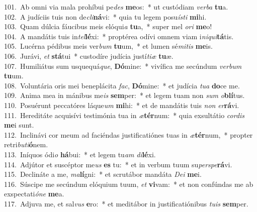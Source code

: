 {101.~}Ab omni via mala prohíbui pe\textit{des} \textbf{me}os:~* ut custódiam \textit{ver}\textit{ba} \textbf{tu}a.\\
{102.~}A judíciis tuis non de\textit{cli}\textbf{ná}vi:~* quia tu legem posu\textit{í}\textit{sti} \textbf{mi}hi.\\
{103.~}Quam dúlcia fáucibus meis elóqui\textit{a} \textbf{tu}a,~* super mel \textit{o}\textit{ri} \textbf{me}o!\\
{104.~}A mandátis tuis in\textit{tel}\textbf{lé}xi:~* proptérea odívi omnem viam i\textit{ni}\textit{qui}\textbf{tá}tis.\\
{105.~}Lucérna pédibus meis ver\textit{bum} \textbf{tu}um,~* et lumen sé\textit{mi}\textit{tis} \textbf{me}is.\\
{106.~}Jurávi, \textit{et} \textbf{stá}tui~* custodíre judícia justí\textit{ti}\textit{æ} \textbf{tu}æ.\\
{107.~}Humiliátus sum usquequá\textit{que}, \textbf{Dó}mine:~* vivífica me secúndum \textit{ver}\textit{bum} \textbf{tu}um.\\
{108.~}Voluntária oris mei beneplácita \textit{fac}, \textbf{Dó}mine:~* et judícia \textit{tu}\textit{a} \textbf{do}ce me.\\
{109.~}Anima mea in mánibus me\textit{is} \textbf{sem}per:~* et legem tuam non \textit{sum} \textit{o}\textbf{blí}tus.\\
{110.~}Posuérunt peccatóres láque\textit{um} \textbf{mi}hi:~* et de mandátis tuis \textit{non} \textit{er}\textbf{rá}vi.\\
{111.~}Hereditáte acquisívi testimónia tua in \textit{æ}\textbf{tér}num:~* quia exsultátio \textit{cor}\textit{dis} \textbf{me}i sunt.\\
{112.~}Inclinávi cor meum ad faciéndas justificatiónes tuas in \textit{æ}\textbf{tér}num,~* propter retri\textit{bu}\textit{ti}\textbf{ó}nem.\\
{113.~}Iníquos ódi\textit{o} \textbf{há}bui:~* et legem tu\textit{am} \textit{di}\textbf{lé}xi.\\
{114.~}Adjútor et suscéptor me\textit{us} \textbf{es} tu:~* et in verbum tuum su\textit{per}\textit{spe}\textbf{rá}vi.\\
{115.~}Declináte a me, \textit{ma}\textbf{lí}gni:~* et scrutábor mandáta \textit{De}\textit{i} \textbf{me}i.\\
{116.~}Súscipe me secúndum elóquium tuum, \textit{et} \textbf{vi}vam:~* et non confúndas me ab exspectati\textit{ó}\textit{ne} \textbf{me}a.\\
{117.~}Adjuva me, et sal\textit{vus} \textbf{e}ro:~* et meditábor in justificatiónibus \textit{tu}\textit{is} \textbf{sem}per.\\
